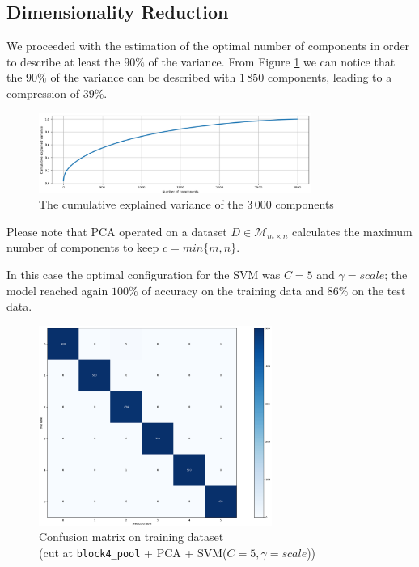 \documentclass[compsoc]{IEEEtran}
\begin{document}
\subsection{Dimensionality Reduction}

We proceeded with the estimation of the optimal number of components in order to describe at least the $90\%$ of the variance.
From Figure \ref{fig:var2} we can notice that the $90\%$ of the variance can be described with $1\,850$ components, leading to a compression of $39\%$.

\begin{figure}[ht!]
\centering                                                                        
\includegraphics[width=3.5in]{../images/var-2.png}
\captionsetup{justification=centering}                                                                                         
\caption{The cumulative explained variance of the $3\,000$ components}
\label{fig:var2}                                                                                                                               
\end{figure}


Please note that PCA operated on a dataset $D \in \mathcal{M}_{m \times n}$ calculates the maximum number of components to keep
$c = min\{m, n\}$. \par

In this case the optimal configuration for the SVM was $C=5$ and $\gamma=scale$; the model reached again $100\%$ of accuracy on the training data and $86\%$ on the test data. 

\begin{figure}[ht!]
\centering                                                                        
\includegraphics[width=3in]{../images/cm2-pca-train.png}
\captionsetup{justification=centering}                                                                                         
\caption{Confusion matrix on training dataset \\ (cut at \texttt{block4\_pool} + PCA + SVM($C=5, \gamma=scale$))}
\label{fig:cm2-pca-train}                                                                                                                               
\end{figure}
\end{document}
